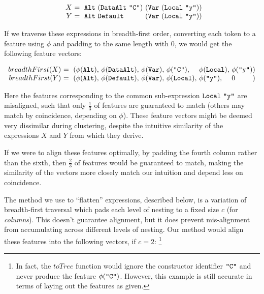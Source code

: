 \begin{equation*}
  \begin{array}{r@{}l@{}l@{}}
    X\ &=\ \CAlt\ (\CDataAlt\ \id{C})\ & (\vlocal{y}) \\
    Y\ &=\ \CAlt\ \CDefault\           & (\vlocal{y})
  \end{array}
\end{equation*}

If we traverse these expressions in breadth-first order, converting each token to a feature using $\phi$ and padding to the same length with $0$, we would get the following feature vectors:

\begin{small}
  \begin{equation*}
    \begin{array}{r@{}l@{}l@{}l@{}l@{}l@{}l@{}l}
      breadthFirst(X)\ &=\ (\feature{\CAlt},\ &\feature{\CDataAlt},\ &\feature{\CVar},\ &\feature{\id{C}},\ &\feature{\CLocal},\ &\feature{\id{y}} &) \\
      breadthFirst(Y)\ &=\ (\feature{\CAlt},\ &\feature{\CDefault},\ &\feature{\CVar},\ &\feature{\CLocal},\ &\feature{\id{y}},\ &0 &)
    \end{array}
  \end{equation*}
\end{small}

Here the features corresponding to the common sub-expression $\texttt{Local}\ \texttt{"y"}$ are misaligned, such that only $\frac{1}{3}$ of features are guaranteed to match (others may match by coincidence, depending on $\phi$). These feature vectors might be deemed very dissimilar during clustering, despite the intuitive similarity of the expressions $X$ and $Y$ from which they derive.

If we were to align these features optimally, by padding the fourth column rather than the sixth, then $\frac{2}{3}$ of features would be guaranteed to match, making the similarity of the vectors more closely match our intuition and depend less on coincidence.

The method we use to ``flatten'' expressions, described below, is a variation of breadth-first traversal which pads each level of nesting to a fixed size $c$ (for \emph{columns}). This doesn't guarantee alignment, but it does prevent mis-alignment from accumulating across different levels of nesting. Our method would align these features into the following vectors, if $c = 2$: \footnote{In fact, the $toTree$ function would ignore the constructor identifier $\texttt{"C"}$ and never produce the feature $\phi(\texttt{"C"})$. However, this example is still accurate in terms of laying out the features as given.}

